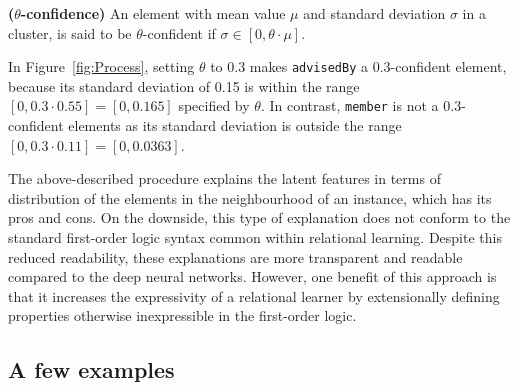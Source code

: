 \begin{definition}{\textbf{($\theta$-confidence)}}
An element with mean value $\mu$ and standard deviation $\sigma$  in a cluster,  is said to be $\theta$-confident if $\sigma \in [0, \theta \cdot \mu]$.
\end{definition}

In Figure~\ref{fig:Process}, setting $\theta$ to 0.3 makes \texttt{advisedBy} a $0.3$-confident element, because its standard deviation of 0.15 is within the range $[0, 0.3 \cdot 0.55] = [0, 0.165]$ specified by $\theta$.
In contrast, \texttt{member} is not a $0.3$-confident elements as its standard deviation is outside the range $[0, 0.3 \cdot 0.11] = [0, 0.0363]$.


The above-described procedure explains the latent features in terms of distribution of the elements in the neighbourhood of an instance, which has its pros and cons.
On the downside, this type of explanation does not conform to the standard first-order logic syntax common within relational learning.
Despite this reduced readability, these explanations are more transparent and readable compared to the deep neural networks.
However, one benefit of this approach is that it increases the expressivity of a relational learner by extensionally defining  properties otherwise inexpressible in the first-order logic.


\subsection{A few examples}







